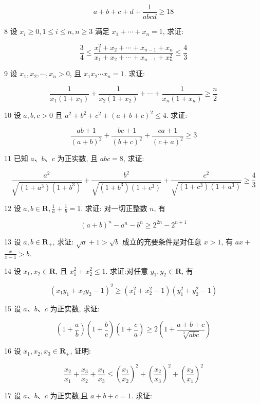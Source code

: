 $$
a+b+c+d+\frac{1}{a b c d} \geqslant 18
$$

8 设 $x_{i} \geqslant 0,1 \leqslant i \leqslant n, n \geqslant 3$ 满足 $x_{1}+\cdots+x_{n}=1$, 求证:

$$
\frac{3}{4} \leqslant \frac{x_{1}^{2}+x_{2}+\cdots+x_{n-1}+x_{n}}{x_{1}+x_{2}+\cdots+x_{n-1}+x_{n}^{2}} \leqslant \frac{4}{3}
$$

9 设 $x_{1}, x_{2}, \cdots, x_{n}>0$, 且 $x_{1} x_{2} \cdots x_{n}=1$. 求证:

$$
\frac{1}{x_{1}\left(1+x_{1}\right)}+\frac{1}{x_{2}\left(1+x_{2}\right)}+\cdots+\frac{1}{x_{n}\left(1+x_{n}\right)} \geqslant \frac{n}{2}
$$

10 设 $a, b, c>0$ 且 $a^{2}+b^{2}+c^{2}+(a+b+c)^{2} \leqslant 4$. 求证:

$$
\frac{a b+1}{(a+b)^{2}}+\frac{b c+1}{(b+c)^{2}}+\frac{c a+1}{(c+a)^{2}} \geqslant 3
$$

11 已知 $a 、 b 、 c$ 为正实数, 且 $a b c=8$, 求证:

$$
\frac{a^{2}}{\sqrt{\left(1+a^{3}\right)\left(1+b^{3}\right)}}+\frac{b^{2}}{\sqrt{\left(1+b^{3}\right)\left(1+c^{3}\right)}}+\frac{c^{2}}{\sqrt{\left(1+c^{3}\right)\left(1+a^{3}\right)}} \geqslant \frac{4}{3}
$$

12 设 $a, b \in \mathbf{R}, \frac{1}{a}+\frac{1}{b}=1$. 求证: 对一切正整数 $n$, 有

$$
(a+b)^{n}-a^{n}-b^{n} \geqslant 2^{2 n}-2^{n+1}
$$

13 设 $a, b \in \mathbf{R}_{+}$, 求证: $\sqrt{a}+1>\sqrt{b}$ 成立的充要条件是对任意 $x>1$, 有 $a x+$ $\frac{x}{x-1}>b$.

14 设 $x_{1}, x_{2} \in \mathbf{R}$, 且 $x_{1}^{2}+x_{2}^{2} \leqslant 1$. 求证:对任意 $y_{1}, y_{2} \in \mathbf{R}$, 有

$$
\left(x_{1} y_{1}+x_{2} y_{2}-1\right)^{2} \geqslant\left(x_{1}^{2}+x_{2}^{2}-1\right)\left(y_{1}^{2}+y_{2}^{2}-1\right)
$$

15 设 $a 、 b 、 c$ 为正实数, 求证:

$$
\left(1+\frac{a}{b}\right)\left(1+\frac{b}{c}\right)\left(1+\frac{c}{a}\right) \geqslant 2\left(1+\frac{a+b+c}{\sqrt[3]{a b c}}\right)
$$

16 设 $x_{1}, x_{2}, x_{3} \in \mathbf{R}_{+}$, 证明:

$$
\frac{x_{2}}{x_{1}}+\frac{x_{3}}{x_{2}}+\frac{x_{1}}{x_{3}} \leqslant\left(\frac{x_{1}}{x_{2}}\right)^{2}+\left(\frac{x_{2}}{x_{3}}\right)^{2}+\left(\frac{x_{3}}{x_{1}}\right)^{2}
$$

17 设 $a 、 b 、 c$ 为正实数,且 $a+b+c=1$. 求证:

